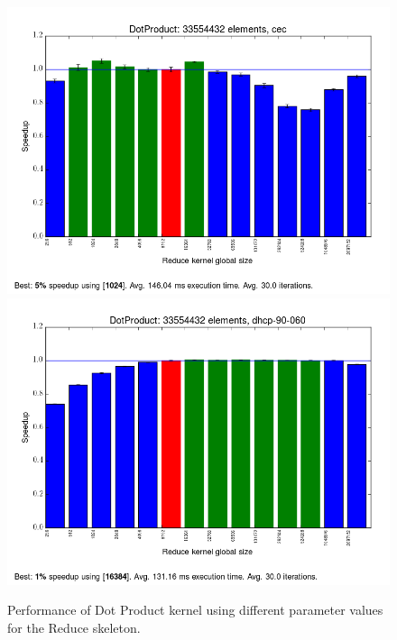 \begin{figure}[h]
\includegraphics[width=\textwidth]{../../benchmarks/results/e3/DotProduct-33554432-cec.png}
\includegraphics[width=\textwidth]{../../benchmarks/results/e3/DotProduct-33554432-dhcp-90-060.png}
\caption{Performance of Dot Product kernel using different parameter
  values for the Reduce skeleton.} %
\label{fig:dp}
\end{figure}

